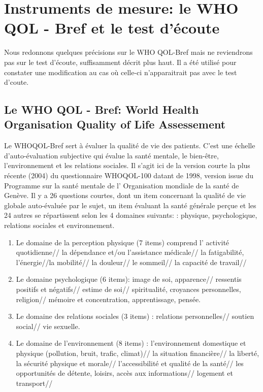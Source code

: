  
 
 

\section{Instruments de mesure: le WHO QOL - Bref et le test d'écoute}
 Nous redonnons quelques précisions sur le WHO QOL-Bref mais ne
 reviendrons pas sur le test d'écoute, suffisamment décrit plus haut. Il a été
 utilisé pour constater une modification au cas où celle-ci
 n'apparaitrait pas avec le test d'coute.

 \subsection{Le WHO QOL - Bref:  World Health
   Organisation Quality of Life Assessement }
 
Le  WHOQOL-Bref sert à évaluer la qualité de vie des patients. C'est une échelle
d'auto-évaluation subjective qui évalue la santé mentale, le
bien-être, l'environnement et les relations sociales.
Il s'agit ici de la version courte  la plus récente (2004) du questionnaire
 WHOQOL-100 datant de 1998, version issue du Programme sur la santé
 mentale de l'
Organisation mondiale de la santé de Genève. Il y a 26 questions
courtes, dont un item concernant la qualité de vie globale
auto-évaluée par le sujet, un item évaluant la santé générale perçue
et les 24 autres se répartissent selon les 4 domaines suivants:  
: physique, psychologique, relations sociales et environnement.
\begin{enumerate}
\item  Le domaine de la perception physique (7 items) comprend l' activité quotidienne// la dépendance et/ou l'assistance médicale// la fatigabilité, l'énergie//la mobilité// la douleur// le sommeil// la capacité de travail//
	
\item Le domaine psychologique (6 items):  image de soi, apparence// ressentis positifs et négatifs// estime de soi// spiritualité, croyances personnelles, religion// mémoire et concentration, apprentissage, pensée.
		
\item Le domaine des relations sociales (3 items) : relations personnelles// soutien social// vie sexuelle.
			
\item Le domaine de l'environnement (8 items) :
                         l'environnement domestique et physique
                         (pollution, bruit, trafic, climat)// la
                         situation financière//  la liberté, la
                         sécurité physique et morale//
                         l'accessibilité et qualité de la santé// les
                         opportunités de détente, loisirs, accès aux
                         informations// logement et transport// 
\end{enumerate}
		
